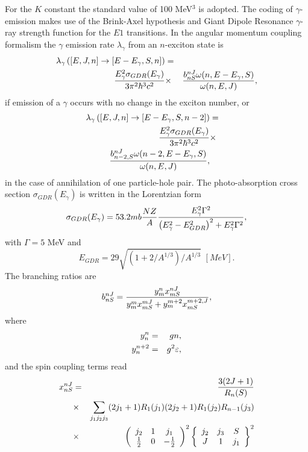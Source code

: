 For the $K$ constant the standard value of 100 MeV$^{3}$ is adopted. The
coding of $\gamma$-emission makes use of the Brink-Axel hypothesis \cite%
{Axel,Brink,Brinka} and Giant Dipole Resonance $\gamma$-ray strength
function for the $E1$ transitions. In the angular momentum coupling
formalism the $\gamma$ emission rate $\lambda_{\gamma}$ from an $n$-exciton
state is
\begin{eqnarray}
\lambda_{\gamma}\left(\left[E,J,n\right]\rightarrow\left[E-E_{\gamma},S,n%
\right]\right)&=& \\
\frac{E_{\gamma}^{2}\sigma_{GDR}(E_{\gamma})}{3\pi^{2}\hbar^{3}c^{2}}&\times&%
\frac{b_{nS}^{nJ}\omega(n,E-E_{\gamma},S)}{\omega(n,E,J)} ,  \notag
\end{eqnarray}
if emission of a $\gamma$ occurs with no change in the exciton number, or
\begin{eqnarray}
\lambda_{\gamma}\left(\left[E,J,n\right]\rightarrow\left[E-E_{\gamma},S,n-2%
\right]\right)&=&  \notag \\
\frac{E_{\gamma}^{2}\sigma_{GDR}(E_{\gamma})}{3\pi^{2}\hbar^{3}c^{2}}&\times&
\notag \\
\frac{b_{n-2,S}^{nJ}\omega(n-2,E-E_{\gamma},S)}{\omega(n,E,J)},&&
\end{eqnarray}
in the case of annihilation of one particle-hole pair. The photo-absorption
cross section $\sigma_{GDR}(E_{\gamma})$ is written in the Lorentzian form
\begin{equation}
\sigma_{GDR}(E_{\gamma})=53.2mb\frac{NZ}{A}\frac{E_{\gamma}^{2}\Gamma^{2}}{%
\left(E_{\gamma}^{2}-E_{GDR}^{2}\right)^{2}+E_{\gamma}^{2}\Gamma^{2}},
\end{equation}
with $\Gamma=5$ MeV and
\begin{equation}
E_{GDR}=29\sqrt{\left(1+2/A^{1/3}\right)/A^{1/3}}\,\,[MeV].
\end{equation}
The branching ratios are
\begin{equation}
b_{nS}^{nJ}=\frac{y_{m}^{n}x_{mS}^{nJ}}{%
y_{m}^{m}x_{mS}^{mJ}+y_{m}^{m+2}x_{mS}^{m+2,J}},
\end{equation}
\noindent where
\begin{eqnarray}
y_{n}^{n} & = & gn,  \notag \\
y_{n}^{n+2} & = & g^{2}\varepsilon,
\end{eqnarray}
and the spin coupling terms read
\begin{eqnarray}
x_{nS}^{nJ} & = & \frac{3(2J+1)}{R_{n}(S)}  \notag \\
& \times
&\sum_{j_{1}j_{2}j_{3}}(2j_{1}+1)R_{1}(j_{1})(2j_{2}+1)R_{1}(j_{2})R_{n-1}(j_{3})
\notag \\
& \times & \left(%
\begin{array}{ccc}
j_{2} & 1 & j_{1} \\
\frac{1}{2} & 0 & -\frac{1}{2}%
\end{array}%
\right)^{2}\left\{
\begin{array}{ccc}
j_{2} & j_{3} & S \\
J & 1 & j_{1}%
\end{array}%
\right\} ^{2}
\end{eqnarray}
